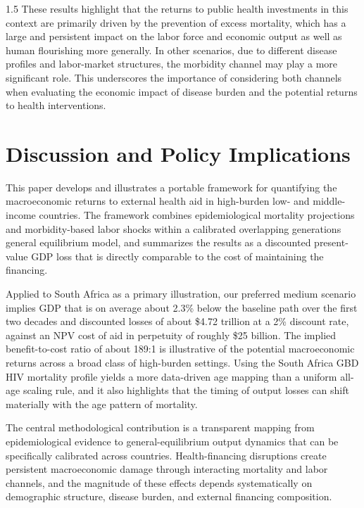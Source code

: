 \documentclass[letterpaper,12pt]{article}
\theoremstyle{definition}
\begin{document}
\begin{spacing}{1.5}
These results highlight that the returns to public health investments in this context are primarily driven by the prevention of excess mortality, which has a large and persistent impact on the labor force and economic output as well as human flourishing more generally.  In other scenarios, due to different disease profiles and labor-market structures, the morbidity channel may play a more significant role. This underscores the importance of considering both channels when evaluating the economic impact of disease burden and the potential returns to health interventions.

\section{Discussion and Policy Implications}\label{SecDiscussion}

This paper develops and illustrates a portable framework for quantifying the macroeconomic returns to external health aid in high-burden low- and middle-income countries. The framework combines epidemiological mortality projections and morbidity-based labor shocks within a calibrated overlapping generations general equilibrium model, and summarizes the results as a discounted present-value GDP loss that is directly comparable to the cost of maintaining the financing.

Applied to South Africa as a primary illustration, our preferred medium scenario implies GDP that is on average about 2.3\% below the baseline path over the first two decades and discounted losses of about \$4.72 trillion at a 2\% discount rate, against an NPV cost of aid in perpetuity of roughly \$25 billion. The implied benefit-to-cost ratio of about 189:1 is illustrative of the potential macroeconomic returns across a broad class of high-burden settings. Using the South Africa GBD HIV mortality profile yields a more data-driven age mapping than a uniform all-age scaling rule, and it also highlights that the timing of output losses can shift materially with the age pattern of mortality.

The central methodological contribution is a transparent mapping from epidemiological evidence to general-equilibrium output dynamics that can be specifically calibrated across countries. Health-financing disruptions create persistent macroeconomic damage through interacting mortality and labor channels, and the magnitude of these effects depends systematically on demographic structure, disease burden, and external financing composition.


\end{spacing}
\end{document}
